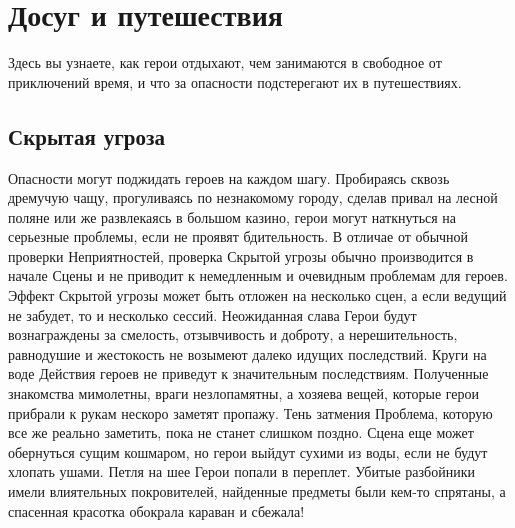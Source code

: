 \chapter{Досуг и путешествия}
Здесь вы узнаете, как герои отдыхают, чем занимаются в свободное от приключений время, и что за опасности подстерегают их в путешествиях.
\section{Скрытая угроза}
Опасности могут поджидать героев на каждом шагу. Пробираясь сквозь дремучую чащу, прогуливаясь по незнакомому городу, сделав привал на лесной поляне или же развлекаясь в большом казино, герои могут наткнуться на серьезные проблемы, если не проявят бдительность. В отличае от обычной проверки Неприятностей, проверка Скрытой угрозы обычно производится в начале Сцены и не приводит к немедленным и очевидным проблемам для героев. Эффект Скрытой угрозы может быть отложен на несколько сцен, а если ведущий не забудет, то и несколько сессий.
\trouble
{Неожиданная слава}%
{Герои будут вознаграждены за смелость, отзывчивость и доброту, а нерешительность, равнодушие и жестокость не возымеют далеко идущих последствий.}%
{Круги на воде}%
{Действия героев не приведут к значительным последствиям. Полученные знакомства мимолетны, враги незлопамятны, а хозяева вещей, которые герои прибрали к рукам нескоро заметят пропажу.}%
{Тень затмения}%
{Проблема, которую все же реально заметить, пока не станет слишком поздно. Сцена еще может обернуться сущим кошмаром, но герои выйдут сухими из воды, если не будут хлопать ушами.}%
{Петля на шее}%
{Герои попали в переплет. Убитые разбойники имели влиятельных покровителей, найденные предметы были кем-то спрятаны, а спасенная красотка обокрала караван и сбежала!}%
